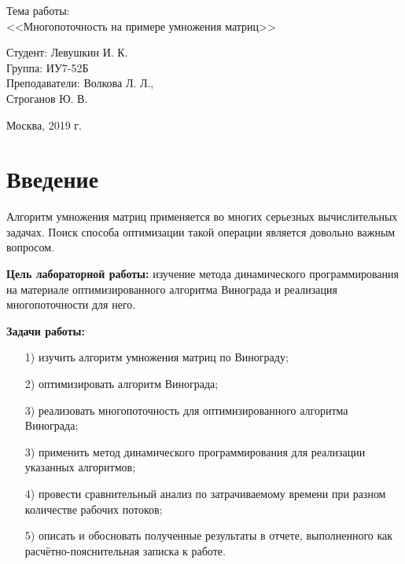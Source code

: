 \documentclass[a4paper,12pt]{article}
\begin{document}
\huge
\begin{center}
	Тема работы:\\
	<<Многопоточность на примере умножения матриц>>
\end{center}
\vspace*{30mm} 

\large
\begin{flushright}
	Студент: Левушкин И. К. \\
	Группа: ИУ7-52Б \\
	Преподаватели: Волкова Л. Л., \\ Строганов Ю. В. \\
\end{flushright}

\vspace*{40mm}
\begin{center}
	Москва, 2019 г.  
\end{center}
\thispagestyle{empty}

\tableofcontents


\section*{Введение}

Алгоритм умножения матриц применяется во многих 
серьезных вычислительных задачах. Поиск способа 
оптимизации такой операции является довольно
важным вопросом.

\textbf{Цель лабораторной работы:} изучение метода динамического программирования на материале оптимизированного алгоритма Винограда и реализация многопоточности для него.

\textbf{Задачи работы:}
\begin{enumerate} 
	\item[1)] изучить алгоритм умножения матриц по Винограду;
	\item[2)] оптимизировать алгоритм Винограда;
	\item[3)] реализовать многопоточность для оптимизированного алгоритма Винограда;
	\item[3)] применить метод динамического программирования для реализации указанных алгоритмов;
	\item[4)] провести сравнительный анализ по затрачиваемому времени при разном количестве рабочих потоков;
	\item[5)] описать и обосновать полученные результаты в отчете, выполненного как расчётно-пояснительная записка к работе. 
\end{enumerate} 
\pagebreak
\end{document}
